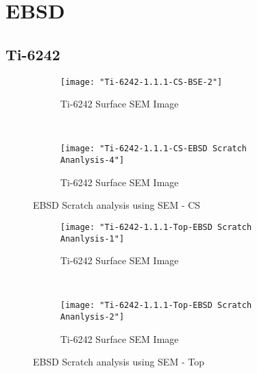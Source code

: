 \newpage
\renewcommand{\workingDate}{\textsc{2017 $|$ September $|$ 14}}
\section{EBSD}
\subsection{Ti-6242}

\begin{figure}[H]
    \centering
    \begin{subfigure}{0.49\textwidth}
        \texttt{[image: "Ti-6242-1.1.1-CS-BSE-2"]}
        \caption{Ti-6242 Surface SEM Image}
        \label{fig:Ti-6242 Williamson-Hall Plot}
    \end{subfigure}
    ~
    \begin{subfigure}{0.49\textwidth}
        \texttt{[image: "Ti-6242-1.1.1-CS-EBSD Scratch Ananlysis-4"]}
        \caption{Ti-6242 Surface SEM Image}
        \label{fig:Ti-6242 Williamson-Hall Plot}
    \end{subfigure}
  
    \caption{EBSD Scratch analysis using SEM - CS}
    \label{fig:EBSD Scratch analysis using SEM - CS}
\end{figure}

\begin{figure}[H]
    \centering
    \begin{subfigure}{0.49\textwidth}
        \texttt{[image: "Ti-6242-1.1.1-Top-EBSD Scratch Ananlysis-1"]}
        \caption{Ti-6242 Surface SEM Image}
        \label{fig:Ti-6242 Williamson-Hall Plot}
    \end{subfigure}
    ~
    \begin{subfigure}{0.49\textwidth}
        \texttt{[image: "Ti-6242-1.1.1-Top-EBSD Scratch Ananlysis-2"]}
        \caption{Ti-6242 Surface SEM Image}
        \label{fig:Ti-6242 Williamson-Hall Plot}
    \end{subfigure}
  
    \caption{EBSD Scratch analysis using SEM - Top}
    \label{fig:EBSD Scratch analysis using SEM - Top}
\end{figure}